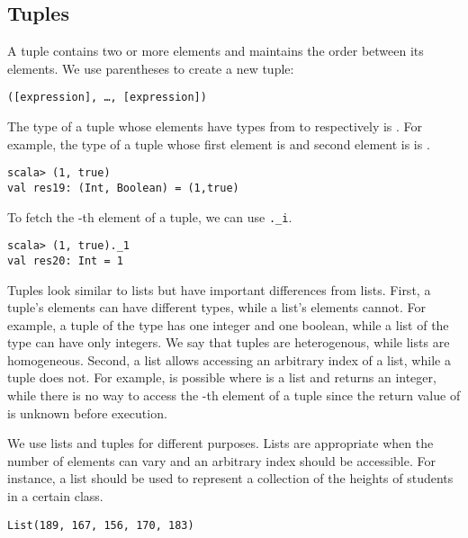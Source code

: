 \subsection{Tuples}

A tuple contains two or more elements and maintains the order between its
elements. We use parentheses to create a new tuple:

\begin{verbatim}
([expression], …, [expression])
\end{verbatim}

The type of a tuple whose elements have types from  to 
respectively is . For example, the type of a tuple
whose first element is  and second element is  is
.

\begin{verbatim}
scala> (1, true)
val res19: (Int, Boolean) = (1,true)
\end{verbatim}

To fetch the -th element of a tuple, we can use \verb+._i+.

\begin{verbatim}
scala> (1, true)._1
val res20: Int = 1
\end{verbatim}

Tuples look similar to lists but have important differences from
lists. First, a tuple's elements can have different types, while a list's
elements cannot. For example, a tuple of the type  has
one integer and one boolean, while a list of the type  can have
only integers. We say that tuples are heterogenous, while lists are homogeneous.
Second, a list allows accessing an arbitrary index of a list,
while a tuple does not. For example,  is possible where  is
a list and  returns an integer, while there is no way to access the
-th element of a tuple since the return value of  is unknown
before execution.

We use lists and tuples for different purposes. Lists are appropriate when the
number of elements can vary and an arbitrary index should be accessible.
For instance, a list should be used to represent a collection of the heights of
students in a certain class.

\begin{verbatim}
List(189, 167, 156, 170, 183)
\end{verbatim}

